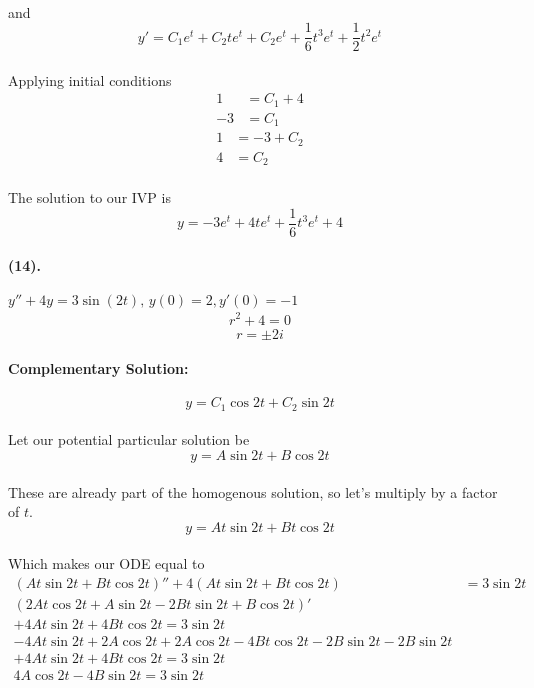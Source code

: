 \documentclass{article}
\begin{document}
\paragraph{}and
\[
    y' = C_1 e^{t} + C_2te^{t} + C_2e^{t} + \frac{1}{6}t^3e^t + \frac{1}{2}t^2e^t 
\]
\paragraph{}Applying initial conditions
\begin{align*}
    1 &= C_1+4\\
    -3 &= C_1
\end{align*}
\begin{align*}
    1 &= -3 + C_2\\
    4 &= C_2
\end{align*}
\paragraph{}The solution to our IVP is
\[
    y = -3e^{t} + 4te^{t} + \frac{1}{6} t^3e^t + 4  
\]
\paragraph{(14).}$y''+4y=3\sin(2t),\, y(0)=2, y'(0)=-1$
\begin{align*}
    r^2 + 4 = 0
\end{align*}
\[
  r = \pm 2i 
\]
\paragraph{Complementary Solution:}
\[
    y = C_1\cos2t + C_2\sin2t 
\]
\paragraph{}Let our potential particular solution be
\[
  y = A\sin2t + B\cos2t 
\]
\paragraph{}These are already part of the homogenous solution, so let's multiply by a factor of $t$.
\[
  y = At\sin2t + Bt\cos2t 
\]
\paragraph{}Which makes our ODE equal to
\begin{align*}
    (At\sin2t + Bt\cos2t)'' + 4(At\sin2t + Bt\cos2t) &= 3\sin2t\\
    (2At\cos2t + A\sin2t - 2Bt\sin2t + B\cos2t)' \\
    + 4At\sin2t + 4Bt\cos2t = 3\sin2t\\
    -4At\sin2t +2A\cos2t + 2A\cos2t -4Bt\cos2t -2B\sin2t-2B\sin2t \\
     + 4At\sin2t + 4Bt\cos2t = 3\sin2t\\
     4A\cos2t - 4B \sin2t = 3\sin2t
\end{align*}
\end{document}
